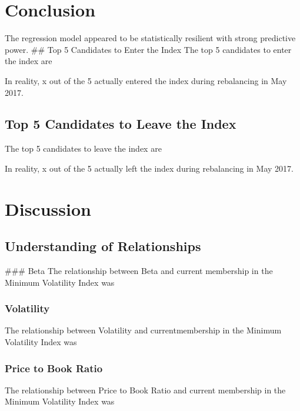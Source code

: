 \documentclass[12pt,twoside]{reedthesis}
\theoremstyle{definition}
\theoremstyle{definition}
\theoremstyle{definition}
\theoremstyle{remark}
\begin{document}
\chapter{Conclusion}\label{conclusion}

The regression model appeared to be statistically resilient with strong
predictive power. \hfill\break
\#\# Top 5 Candidates to Enter the Index The top 5 candidates to enter
the index are

In reality, x out of the 5 actually entered the index during rebalancing
in May 2017. \hfill\break

\section{Top 5 Candidates to Leave the
Index}\label{top-5-candidates-to-leave-the-index}

The top 5 candidates to leave the index are

In reality, x out of the 5 actually left the index during rebalancing in
May 2017.

\hfill\break

\chapter{Discussion}\label{discussion}

\hfill\break

\section{Understanding of
Relationships}\label{understanding-of-relationships}

\hfill\break
\#\#\# Beta The relationship between Beta and current membership in the
Minimum Volatility Index was \hfill\break

\subsection{Volatility}\label{volatility}

The relationship between Volatility and currentmembership in the Minimum
Volatility Index was \hfill\break

\subsection{Price to Book Ratio}\label{price-to-book-ratio}

The relationship between Price to Book Ratio and current membership in
the Minimum Volatility Index was \hfill\break
\end{document}
